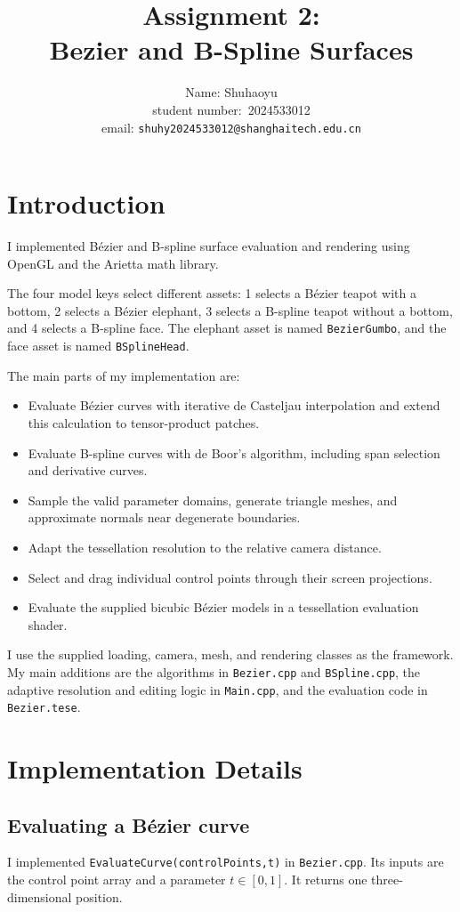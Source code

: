 \documentclass[acmtog]{acmart}
\title{Assignment 2:\\ {Bezier and B-Spline Surfaces}}
\author{Name: \quad Shuhaoyu \\ student number:\ 2024533012
\\email: \quad \texttt{shuhy2024533012@shanghaitech.edu.cn}}
\begin{document}
  \maketitle

  \vspace*{2 ex}

  \section{Introduction}
I implemented B\'ezier and B-spline surface evaluation and rendering using OpenGL and the Arietta math library. 

The four model keys select different assets: 1 selects a B\'ezier teapot with a bottom, 2 selects a B\'ezier elephant, 3 selects a B-spline teapot without a bottom, and 4 selects a B-spline face. The elephant asset is named \texttt{BezierGumbo}, and the face asset is named \texttt{BSplineHead}.


The main parts of my implementation are:
\begin{itemize}
\item Evaluate B\'ezier curves with iterative de Casteljau interpolation and extend this calculation to tensor-product patches.
\item Evaluate B-spline curves with de Boor's algorithm, including span selection and derivative curves.
\item Sample the valid parameter domains, generate triangle meshes, and approximate normals near degenerate boundaries.
\item Adapt the tessellation resolution to the relative camera distance.
\item Select and drag individual control points through their screen projections.
\item Evaluate the supplied bicubic B\'ezier models in a tessellation evaluation shader.
\end{itemize}
I use the supplied loading, camera, mesh, and rendering classes as the framework. My main additions are the algorithms in \texttt{Bezier.cpp} and \texttt{BSpline.cpp}, the adaptive resolution and editing logic in \texttt{Main.cpp}, and the evaluation code in \texttt{Bezier.tese}.

  \section{Implementation Details}
\subsection{Evaluating a B\'ezier curve}
I implemented \texttt{EvaluateCurve(controlPoints,t)} in \texttt{Bezier.cpp}. Its inputs are the control point array and a parameter $t\in[0,1]$. It returns one three-dimensional position.
\end{document}
